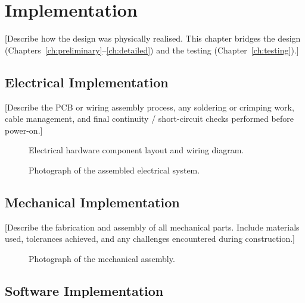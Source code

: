 \chapter{Implementation}
\label{ch:implementation}

[Describe how the design was physically realised. This chapter
bridges the design (Chapters~\ref{ch:preliminary}–\ref{ch:detailed})
and the testing (Chapter~\ref{ch:testing}).]

\section{Electrical Implementation}
\label{sec:elec-impl}

[Describe the PCB or wiring assembly process, any soldering or
crimping work, cable management, and final continuity / short-circuit
checks performed before power-on.]

\begin{figure}[H]
    \centering
    \caption{Electrical hardware component layout and wiring diagram.}
    \label{fig:wiring}
\end{figure}

\begin{figure}[H]
    \centering
    \caption{Photograph of the assembled electrical system.}
    \label{fig:elec-photo}
\end{figure}

\section{Mechanical Implementation}
\label{sec:mech-impl}

[Describe the fabrication and assembly of all mechanical parts.
Include materials used, tolerances achieved, and any challenges
encountered during construction.]

\begin{figure}[H]
    \centering
    \caption{Photograph of the mechanical assembly.}
    \label{fig:mech-photo}
\end{figure}

\section{Software Implementation}
\label{sec:sw-impl}

